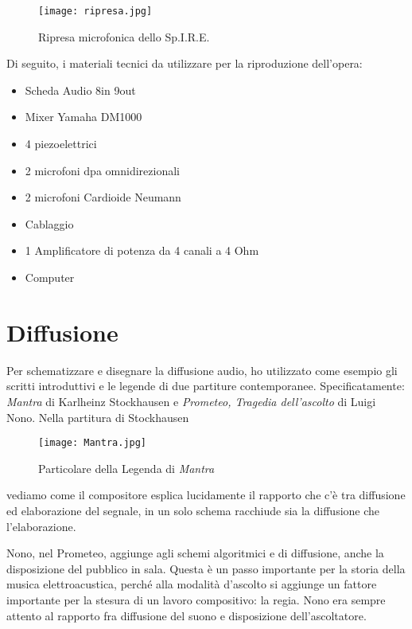 \begin{figure}[htbp]
\begin{center}
\texttt{[image: ripresa.jpg]}
\caption{Ripresa microfonica dello Sp.I.R.E.}
\label{default}
\end{center}
\end{figure}

Di seguito, i materiali tecnici da utilizzare per la riproduzione dell'opera:

\begin{itemize}
	\item{Scheda Audio 8in 9out}
	\item{Mixer Yamaha DM1000}
	\item{4 piezoelettrici}
	\item{2 microfoni dpa omnidirezionali}
	\item{2 microfoni Cardioide Neumann}
	\item{Cablaggio}
	\item{1 Amplificatore di potenza da 4 canali a 4 Ohm}
	\item{Computer}
\end{itemize}


\section{Diffusione} 

Per schematizzare e disegnare la diffusione audio, ho utilizzato come esempio gli scritti introduttivi e le legende di due partiture contemporanee. Specificatamente: \textit{Mantra} di Karlheinz Stockhausen e \textit{Prometeo, Tragedia dell'ascolto} di Luigi Nono. Nella partitura di Stockhausen

\begin{figure}[htbp]
\begin{center}
\texttt{[image: Mantra.jpg]}
\caption{Particolare della Legenda di \textit{Mantra}}
\label{default}
\end{center}
\end{figure}

vediamo come il compositore esplica lucidamente il rapporto che c'è tra diffusione ed elaborazione del segnale, in un solo schema racchiude sia la diffusione che l'elaborazione.

Nono, nel Prometeo, aggiunge agli schemi algoritmici e di diffusione, anche la disposizione del pubblico in sala. Questa è un passo importante per la storia della musica elettroacustica, perché alla modalità d'ascolto si aggiunge un fattore importante per la stesura di un lavoro compositivo: la regia. Nono era sempre attento al rapporto fra diffusione del suono e disposizione dell'ascoltatore.


